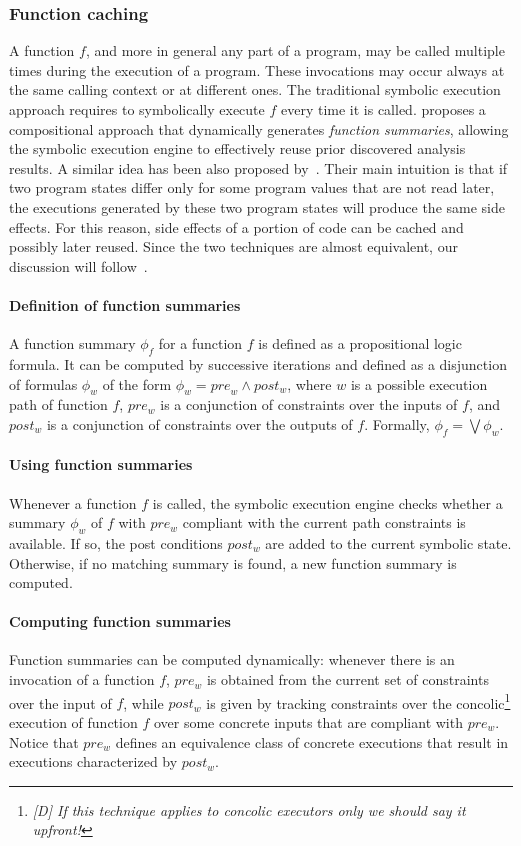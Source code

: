 \subsubsection{Function caching} A function $f$, and more in general any part of a program, may be called multiple times during the execution of a program. These invocations may occur always at the same calling context or at different ones. The traditional symbolic execution approach requires to symbolically execute $f$ every time it is called. \cite{G-POPL07} proposes a compositional approach that dynamically generates {\em function summaries}, allowing the symbolic execution engine to effectively reuse prior discovered analysis results. A similar idea has been also proposed by~\cite{BCE-TACAS08}. Their main intuition is that if two program states differ only for some program values that are not read later, the executions generated by these two program states will produce the same
side effects. For this reason, side effects of a portion of code can be cached and possibly later reused. Since the two techniques are almost equivalent, our discussion will follow~\cite{G-POPL07}. %

\paragraph{Definition of function summaries} A function summary $\phi_f$ for a function $f$ is defined as a propositional logic formula. It can be computed by successive iterations and defined as a disjunction of formulas $\phi_w$ of the form $\phi_w = {pre}_w \wedge post_w$, where $w$ is a possible execution path of function $f$, $pre_w$ is a conjunction of constraints over the inputs of $f$, and $post_w$ is a conjunction of constraints over the outputs of $f$. Formally, $\phi_f = \bigvee \phi_w$.  

\paragraph{Using function summaries} Whenever a function $f$ is called, the symbolic execution engine checks whether a summary $\phi_w$ of $f$ with $pre_w$ compliant with the current path constraints is available. If so, the post conditions $post_w$ are added to the current symbolic state. Otherwise, if no matching summary is found, a new function summary is computed.

\paragraph{Computing function summaries} Function summaries can be computed dynamically: whenever there is an invocation of a function $f$, $pre_w$ is obtained from the current set of constraints over the input of $f$, while $post_w$ is given by tracking constraints over the concolic\footnote{{\em [D] If this technique applies to concolic executors only we should say it upfront!}} execution of function $f$ over some concrete inputs that are compliant with $pre_w$. Notice that $pre_w$ defines an equivalence class of concrete executions that result in executions characterized by $post_w$. 

